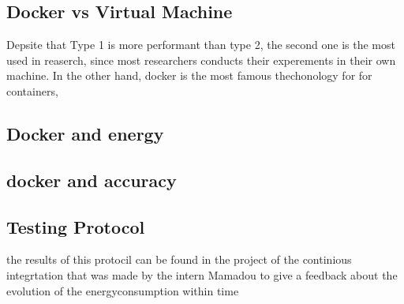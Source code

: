 \subsection{Docker vs Virtual Machine}
Depsite that Type 1 is more performant than type 2, the second one is the most used in reaserch, since most researchers conducts their experements in their own machine. In the other hand, docker is the most famous thechonology for for containers,


\subsection{Docker and energy}


\subsection{docker and accuracy}





\subsection{Testing Protocol}
the results of this protocil can be found in the project of the continious integrtation that was made by the intern Mamadou to give a feedback about the evolution of the energyconsumption within time


